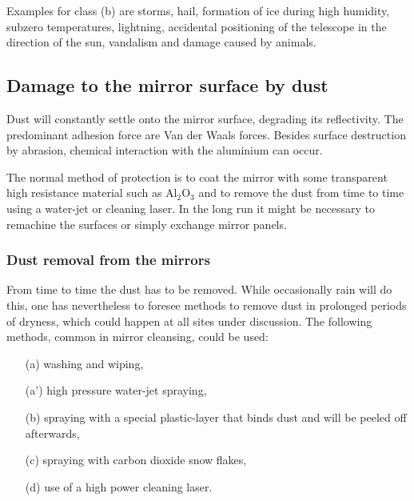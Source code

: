 Examples for class (b) are storms, hail, formation of ice during high
humidity, subzero temperatures, lightning, accidental positioning 
of the telescope in the direction of the sun, vandalism
and damage caused by animals.

\subsection{Damage to the mirror surface by dust}


\medskip Dust will constantly settle onto the mirror surface, degrading its
reflectivity. The predominant adhesion force are Van der Waals forces.
Besides surface destruction by abrasion, chemical interaction with the
aluminium can occur.

The normal method of protection is to coat the mirror with some transparent
high resistance material such as Al$_2$O$_3$ and to remove the dust from
time to time using a water-jet or cleaning laser. In the long run it might
be necessary to remachine the surfaces or simply exchange mirror panels.

\subsubsection{Dust removal from the mirrors}


\medskip From time to time the dust has to be removed. While occasionally
rain will do this, one has nevertheless to foresee methods to remove dust in
prolonged periods of dryness, which could happen at all sites under
discussion. The following methods, common in mirror cleansing, could be used:

\begin{itemize}
\item[(a)]  washing and wiping,

\item[(a')]  high pressure water-jet spraying,

\item[(b)]  spraying with a special plastic-layer that binds dust and will
be peeled off afterwards,

\item[(c)]  spraying with carbon dioxide snow flakes,

\item[(d)]  use of a high power cleaning laser.
\end{itemize}

